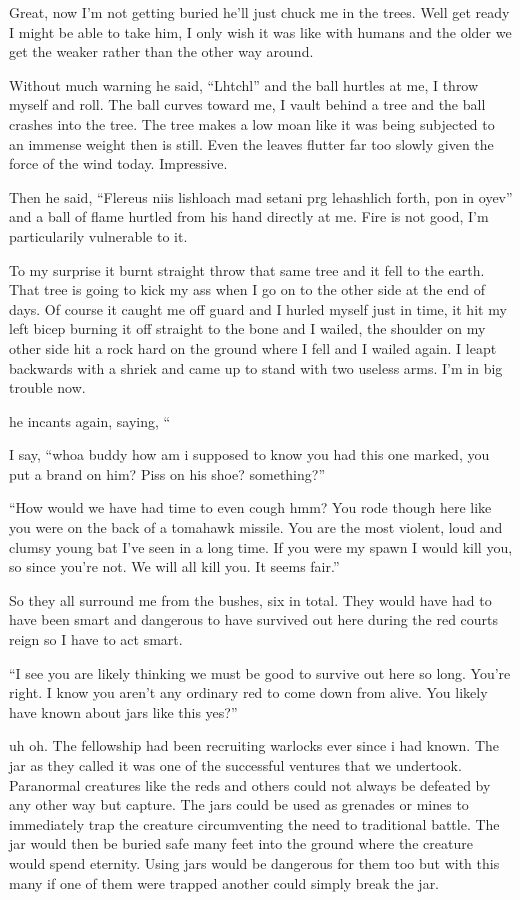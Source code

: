 Great, now I'm not getting buried he'll just chuck me in the trees. Well get ready I might be able to take him, I only wish it was like with humans and the older we get the weaker rather than the other way around.

Without much warning he said, ``Lhtchl'' and the ball hurtles at me, I throw myself and roll. The ball curves toward me, I vault behind a tree and the ball crashes into the tree. The tree makes a low moan like it was being subjected to an immense weight then is still. Even the leaves flutter far too slowly given the force of the wind today. Impressive.

Then he said, ``Flereus niis lishloach mad setani prg lehashlich forth, pon in oyev'' and a ball of flame hurtled from his hand directly at me. Fire is not good, I'm particularily vulnerable to it.

To my surprise it burnt straight throw that same tree and it fell to the earth. That tree is going to kick my ass when I go on to the other side at the end of days. Of course it caught me off guard and I hurled myself just in time, it hit my left bicep burning it off straight to the bone and I wailed, the shoulder on my other side hit a rock hard on the ground where I fell and I wailed again. I leapt backwards with a shriek and came up to stand with two useless arms. I'm in big trouble now.

he incants again, saying, ``



I say, ``whoa buddy how am i supposed to know you had this one marked, you put a brand on him? Piss on his shoe? something?''

``How would we have had time to even cough hmm? You rode though here like you were on the back of a tomahawk missile. You are the most violent, loud and clumsy young bat I've seen in a long time. If you were my spawn I would kill you, so since you're not. We will all kill you. It seems fair.''

So they all surround me from the bushes, six in total. They would have had to have been smart and dangerous to have survived out here during the red courts reign so I have to act smart.

``I see you are likely thinking we must be good to survive out here so long. You're right. I know you aren't any ordinary red to come down from \chichenitza alive. You likely have known about jars like this yes?''

uh oh. The fellowship had been recruiting warlocks ever since i had known. The jar as they called it was one of the successful ventures that we undertook. Paranormal creatures like the reds and others could not always be defeated by any other way but capture. The jars could be used as grenades or mines to immediately trap the creature circumventing the need to traditional battle. The jar would then be buried safe many feet into the ground where the creature would spend eternity. Using jars would be dangerous for them too but with this many if one of them were trapped another could simply break the jar.

